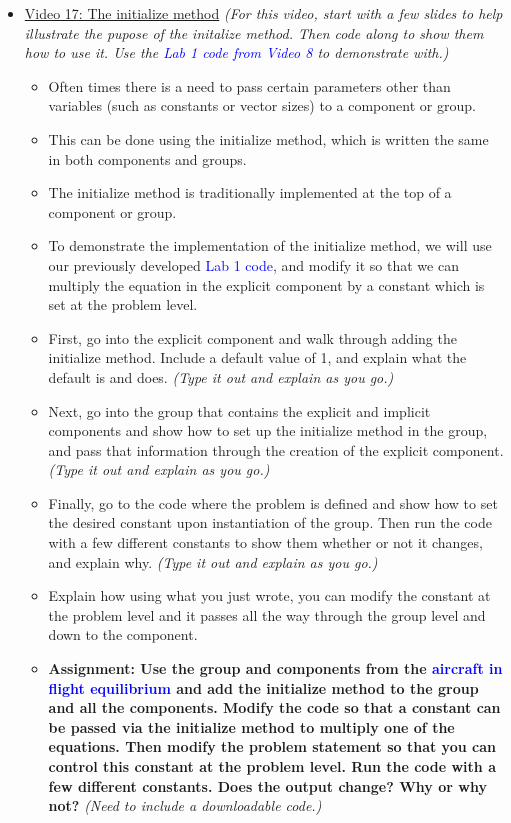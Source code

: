 \documentclass[12pt, letterpaper]{article}
\begin{document}
\begin{itemize}
	\item \underline{Video 17: The initialize method} \textit{(For this video, start with a few slides to help illustrate the pupose of the initalize method. Then code along to show them how to use it. Use the \textcolor{blue}{Lab 1 code from Video 8} to demonstrate with.)}
		\begin{itemize}
			\item Often times there is a need to pass certain parameters other than variables (such as constants or vector sizes) to a component or group.
			\item This can be done using the initialize method, which is written the same in both components and groups.
			\item The initialize method is traditionally implemented at the top of a component or group.
			\item To demonstrate the implementation of the initialize method, we will use our previously developed \textcolor{blue}{Lab 1 code}, and modify it so that we can multiply the equation in the explicit component by a constant which is set at the problem level. 
			\item First, go into the explicit component and walk through adding the initialize method. Include a default value of 1, and explain what the default is and does. \textit{(Type it out and explain as you go.)}
			\item Next, go into the group that contains the explicit and implicit components and show how to set up the initialize method in the group, and pass that information through the creation of the explicit component. \textit{(Type it out and explain as you go.)}
			\item Finally, go to the code where the problem is defined and show how to set the desired constant upon instantiation of the group. Then run the code with a few different constants to show them whether or not it changes, and explain why. \textit{(Type it out and explain as you go.)}
			\item Explain how using what you just wrote, you can modify the constant at the problem level and it passes all the way through the group level and down to the component.
			\item \textbf{Assignment: Use the group and components from the \textcolor{blue}{aircraft in flight equilibrium} and add the initialize method to the group and all the components. Modify the code so that a constant can be passed via the initialize method to multiply one of the equations. Then modify the problem statement so that you can control this constant at the problem level. Run the code with a few different constants. Does the output change? Why or why not?} \textit{(Need to include a downloadable code.)}
		\end{itemize}
		

\end{itemize}
\end{document}
